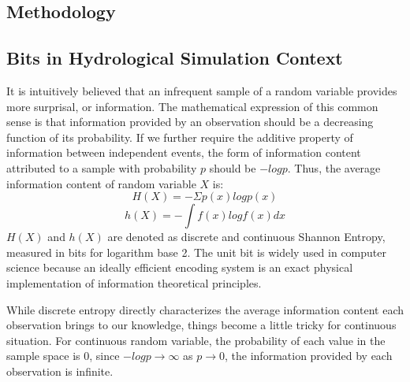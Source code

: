\documentclass[11pt]{article}
\begin{document}
\fi

\newpage
\begin{center}
\section{Methodology}
\end{center}

 
\subsection{Bits in Hydrological Simulation Context}
It is intuitively believed that an infrequent sample of a random variable provides more surprisal, or information. The  mathematical expression of this common sense is that information provided by an observation should be a decreasing function of its probability. If we further require the additive property of information between independent events, the form of information content attributed to a sample with probability $p$ should be $-logp$. Thus, the average information content of random variable $X$ is:
\begin{equation}
H(X)=-\Sigma p(x)logp(x)
\end{equation}
\begin{equation}
h(X)=-\int f(x)logf(x)dx
\end{equation}   
$H(X)$ and $h(X)$ are denoted as discrete and continuous Shannon Entropy, measured in bits for logarithm base 2. The unit bit is widely used in computer science because an ideally efficient encoding system is an exact physical implementation of information theoretical principles. 

While discrete entropy directly characterizes the average information content each observation brings to our knowledge, things become a little tricky for continuous situation. For continuous random variable, the probability of each value in the sample space is 0, since $-logp \to \infty$  as $p \to 0$, the information provided by each observation is infinite.  
\end{document}
